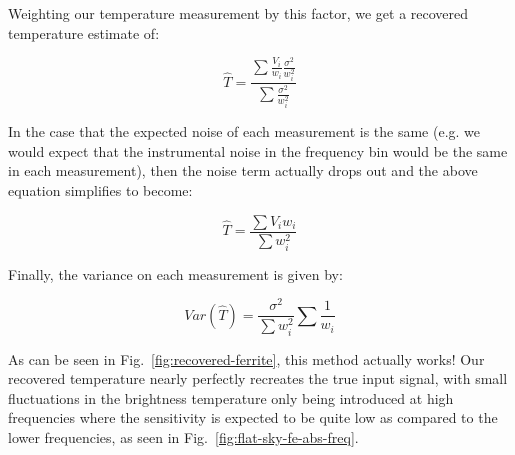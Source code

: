 Weighting our temperature measurement by this factor, we get a recovered 
temperature estimate of:

\begin{equation}
     \hat{T} = \frac{\sum \frac{V_i}{w_i} \frac{\sigma^2}{w_i^2}}{\sum 
     \frac{\sigma^2}{w_i^2}}
     \label{eq:measured-T}
\end{equation}

In the case that the expected noise of each measurement is the same (e.g. we 
would expect that the instrumental noise in the frequency bin would be the same 
in each measurement), then the noise term actually drops out and the above 
equation simplifies to become:

\begin{equation}
     \hat{T} = \frac{\sum V_i w_i}{\sum w_i^2}
     \label{eq:measured-T-simplified}
\end{equation}

Finally, the variance on each measurement is given by:

\begin{equation}
    Var(\hat{T}) = \frac{\sigma^2}{\sum w_i^2} \sum \frac{1}{w_i}
    \label{eq:measured-T-variance}
\end{equation}

As can be seen in Fig.~\ref{fig:recovered-ferrite}, this method actually works!  
Our recovered temperature nearly perfectly recreates the true input signal, 
with small fluctuations in the brightness temperature only being introduced at 
high frequencies where the sensitivity is expected to be quite low as compared 
to the lower frequencies, as seen in Fig.~\ref{fig:flat-sky-fe-abs-freq}.

